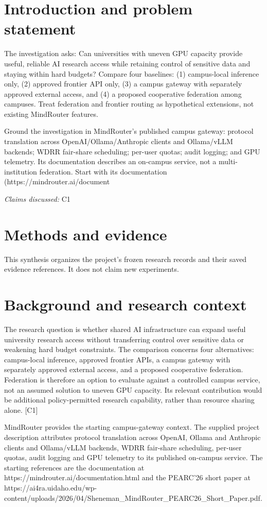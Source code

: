 \documentclass[11pt]{article}
\begin{document}
\section{Introduction and problem statement}
The investigation asks: Can universities with uneven GPU capacity provide useful, reliable AI research access while retaining control of sensitive data and staying within hard budgets? Compare four baselines: (1) campus-local inference only, (2) approved frontier API only, (3) a campus gateway with separately approved external access, and (4) a proposed cooperative federation among campuses. Treat federation and frontier routing as hypothetical extensions, not existing MindRouter features.

Ground the investigation in MindRouter's published campus gateway: protocol translation across OpenAI/Ollama/Anthropic clients and Ollama/vLLM backends; WDRR fair-share scheduling; per-user quotas; audit logging; and GPU telemetry. Its documentation describes an on-campus service, not a multi-institution federation. Start with its documentation (https://mindrouter.ai/document

\textit{Claims discussed: }C1
\section{Methods and evidence}
This synthesis organizes the project's frozen research records and their saved evidence references. It does not claim new experiments.

\section{Background and research context}
The research question is whether shared AI infrastructure can expand useful university research access without transferring control over sensitive data or weakening hard budget constraints. The comparison concerns four alternatives: campus-local inference, approved frontier APIs, a campus gateway with separately approved external access, and a proposed cooperative federation. Federation is therefore an option to evaluate against a controlled campus service, not an assumed solution to uneven GPU capacity. Its relevant contribution would be additional policy-permitted research capability, rather than resource sharing alone. [C1]

MindRouter provides the starting campus-gateway context. The supplied project description attributes protocol translation across OpenAI, Ollama and Anthropic clients and Ollama/vLLM backends, WDRR fair-share scheduling, per-user quotas, audit logging and GPU telemetry to its published on-campus service. The starting references are the documentation at https://mindrouter.ai/documentation.html and the PEARC\textquoteright{}26 short paper at https://ai4ra.uidaho.edu/wp-content/uploads/2026/04/Sheneman\_MindRouter\_PEARC26\_Short\_Paper.pdf.
\end{document}

